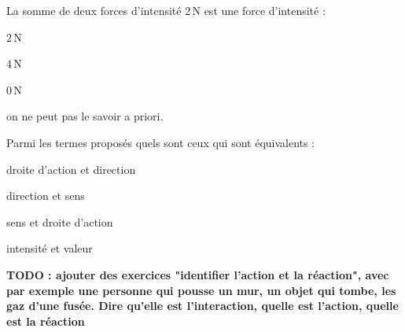 \begin{QCM}
  
  \begin{GroupeQCM}
    
    \begin{exercice}
      La somme de deux forces d'intensité 2\,N est une force d'intensité :
      \begin{ChoixQCM}{4}
      \item $2$\,N
      \item $4$\,N
      \item $0$\,N
      \item on ne peut pas le savoir a priori.
      \end{ChoixQCM}
        \begin{corrige}
        \end{corrige}
    \end{exercice}
    
    
    \begin{exercice}
      Parmi les termes proposés quels sont ceux qui sont équivalents :
      \begin{ChoixQCM}{4}
      \item droite d'action et direction
      \item direction et sens
      \item sens et droite d'action
      \item intensité et valeur
      \end{ChoixQCM}
\begin{corrige}
   \end{corrige}
    \end{exercice}
    
\end{GroupeQCM}
\end{QCM}



\textbf{TODO : ajouter des exercices "identifier l'action et la réaction", avec par exemple une personne qui pousse un mur, un objet qui tombe, les gaz d'une fusée. Dire qu'elle est l'interaction, quelle est l'action, quelle est la réaction}
